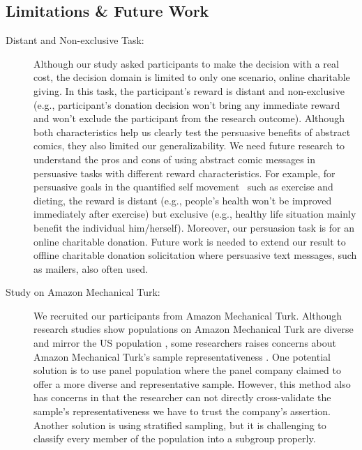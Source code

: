 \subsection{Limitations \& Future Work}
\begin{description}

 \item[Distant and Non-exclusive Task:]  Although our study asked participants to make the decision with a real cost, the decision domain is limited to only one scenario, online charitable giving. In this task, the participant's reward is distant and non-exclusive (e.g., participant's donation decision won't bring any immediate reward and won't exclude the participant from the research outcome). Although both characteristics help us clearly test the persuasive benefits of abstract comics, they also limited our generalizability. We need future research to understand the pros and cons of using abstract comic messages in persuasive tasks with different reward characteristics. For example, for persuasive goals in the quantified self movement~\cite{Epstein2014,Choe2014} such as exercise and dieting, the reward is distant (e.g., people's health won't be improved immediately after exercise) but exclusive (e.g., healthy life situation mainly benefit the individual him/herself). Moreover, our persuasion task is for an online charitable donation. Future work is needed to extend our result to offline charitable donation solicitation where persuasive text messages, such as mailers, also often used. 

\item[Study on Amazon Mechanical Turk:] We recruited our participants from Amazon Mechanical Turk. Although research studies show populations on Amazon Mechanical Turk are diverse and mirror the US population \cite{buhrmester2011amazon,behrend2011viability,berinsky2012evaluating}, some researchers raises concerns about Amazon Mechanical Turk's sample representativeness \cite{landers2015inconvenient,paolacci2010running}. One potential solution is to use panel population where the panel company claimed to offer a more diverse and representative sample.
However, this method also has concerns in that the researcher can not directly cross-validate the sample's representativeness we have to trust the company's assertion. Another solution is using stratified sampling, but it is challenging to classify every member of the population into a subgroup properly. 


\end{description}
